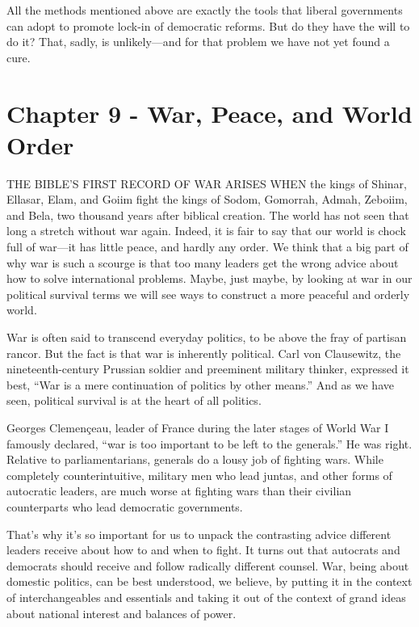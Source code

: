 \documentclass[10pt]{article}
\begin{document}
{\large All the methods mentioned above are exactly the tools that liberal
governments can adopt to promote lock-in of democratic reforms. But do they have
the will to do it? That, sadly, is unlikely---and for that problem we have not
yet found a cure.}
\pagebreak{}


\section{Chapter 9 - War, Peace, and World Order}

{\large THE BIBLE'S FIRST RECORD OF WAR ARISES WHEN the kings of Shinar,
Ellasar, Elam, and Goiim fight the kings of Sodom, Gomorrah, Admah, Zeboiim, and
Bela, two thousand years after biblical creation. The world has not seen that
long a stretch without war again. Indeed, it is fair to say that our world is
chock full of war---it has little peace, and hardly any order. We think that a
big part of why war is such a scourge is that too many leaders get the wrong
advice about how to solve international problems. Maybe, just maybe, by looking
at war in our political survival terms we will see ways to construct a more
peaceful and orderly world.}

{\large War is often said to transcend everyday politics, to be above the fray
of partisan rancor. But the fact is that war is inherently political. Carl von
Clausewitz, the nineteenth-century Prussian soldier and preeminent military
thinker, expressed it best, ``War is a mere continuation of politics by other
means.'' And as we have seen, political survival is at the heart of all
politics.}

{\large Georges Clemen\c{c}eau, leader of France during the later stages of
World War I famously declared, ``war is too important to be left to the
generals.'' He was right. Relative to parliamentarians, generals do a lousy job
of fighting wars. While completely counterintuitive, military men who lead
juntas, and other forms of autocratic leaders, are much worse at fighting wars
than their civilian counterparts who lead democratic governments.}

{\large That's why it's so important for us to unpack the contrasting advice
different leaders receive about how to and when to fight. It turns out that
autocrats and democrats should receive and follow radically different counsel.
War, being about domestic politics, can be best understood, we believe, by
putting it in the context of interchangeables and essentials and taking it out of
the context of grand ideas about national interest and balances of power.}
\end{document}
